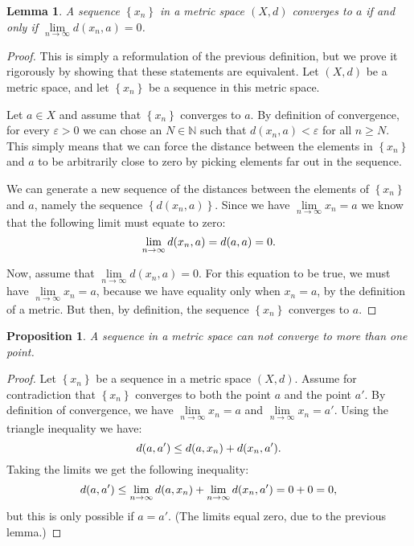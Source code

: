 \documentclass[a4paper]{report}
\newtheorem{prp}{Proposition}
\newtheorem{lma}{Lemma}
\theoremstyle{definition}
\begin{document}
\begin{lma}
  A sequence $\left\{ x_{n}\right\}$ in a metric space $(X, d)$ converges to
  $a$ if and only if $\lim\limits_{n\rightarrow\infty} d(x_{n}, a) = 0$.
\end{lma}
\begin{proof}
  This is simply a reformulation of the previous definition, but we prove it
  rigorously by showing that these statements are equivalent.
  Let $(X, d)$ be a metric space, and let $\left\{ x_n \right\}$ be a sequence
  in this metric space.  

  Let $a \in X$ and assume that $\left\{ x_n \right\}$ converges to $a$. By
  definition of convergence, for every $\varepsilon > 0$ we can chose an $N \in
  \mathbb{N}$ such that $d(x_{n}, a) < \varepsilon$ for all $n \geq N$.  This
  simply means that we can force the distance between the elements in $\left\{
  x_{n} \right\}$ and $a$ to be arbitrarily close to zero by picking elements
  far out in the sequence. 

  We can generate a new sequence of the distances
  between the elements of $\left\{ x_n \right\}$ and $a$, namely the sequence
  $\left\{d(x_n, a)\right\}$.  Since we have $\lim\limits_{n\rightarrow\infty} x_n
  = a$ we know that the following limit must equate to zero:
  \begin{equation}
    \notag
    \lim\limits_{n\rightarrow\infty}d(x_n, a) = d(a, a) = 0.
  \end{equation}

  Now, assume that $\lim\limits_{n\rightarrow\infty} d(x_{n}, a) = 0$.  For
  this equation to be true, we must have $\lim\limits_{n\rightarrow\infty}x_n =
  a$, because we have equality only when $x_n = a$, by the definition of a
  metric.  But then, by definition, the sequence $\left\{ x_n \right\}$
  converges to $a$.
\end{proof}

\begin{prp}
  A sequence in a metric space can not converge to more than one point. 
\end{prp}

\begin{proof}
  Let $\left\{ x_n \right\}$ be a sequence in a metric space $(X, d)$. Assume
  for contradiction that $\left\{ x_{n} \right\}$ converges to both the point
  $a$ and the point $a'$.  By definition of convergence, we have
  $\lim\limits_{n\rightarrow\infty} x_n = a$ and
  $\lim\limits_{n\rightarrow\infty} x_n = a'$.
  Using the triangle inequality we have:
  \begin{equation}
    \notag
    d(a, a') \leq d(a, x_n) + d(x_n, a').
  \end{equation}
  Taking the limits we get the following inequality:
  \begin{equation}
    \notag
    d(a, a') \leq \lim\limits_{n\rightarrow\infty} d(a, x_n) + \lim\limits_{n\rightarrow\infty} d(x_n, a') = 0 + 0 = 0, 
  \end{equation}
  but this is only possible if $a = a'$. (The limits equal zero, due to the previous lemma.)
\end{proof}
\end{document}
